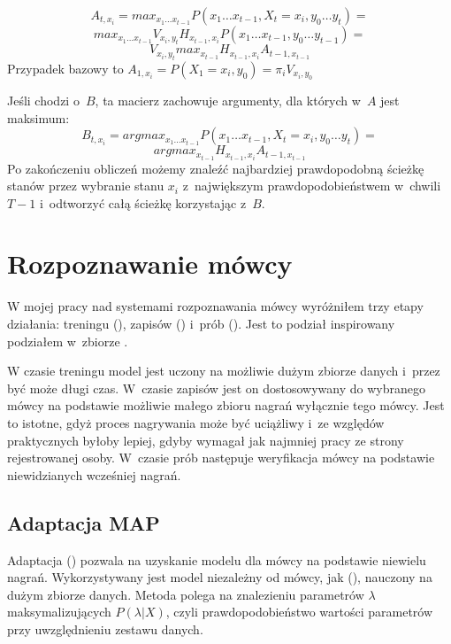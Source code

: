 $$A_{t,x_i} = max_{x_1 \dots x_{t-1}} P(x_1 \dots x_{t-1}, X_t = x_i, y_0 \dots y_t) =$$
$$max_{x_1 \dots x_{t-1}} V_{x_i, y_t} H_{x_{t-1}, x_i} P(x_1 \dots x_{t-1}, y_0 \dots y_{t-1}) =$$
$$V_{x_i, y_t} max_{x_{t-1}}H_{x_{t-1}, x_i} A_{t-1, x_{t-1}}$$
Przypadek bazowy to $A_{1,x_i} = P(X_1 = x_i, y_0) = \pi_i V_{x_i, y_0}$

Jeśli chodzi o~$B$, ta macierz zachowuje argumenty, dla których w~$A$ jest maksimum:
$$B_{t, x_i} = argmax_{x_1 \dots x_{t-1}} P(x_1 \dots x_{t-1}, X_t = x_i, y_0 \dots y_t) =$$
$$argmax_{x_{t-1}} H_{x_{t-1}, x_i} A_{t-1, x_{t-1}}$$
Po zakończeniu obliczeń możemy znaleźć najbardziej prawdopodobną ścieżkę stanów przez wybranie stanu $x_i$ z~największym prawdopodobieństwem w~chwili $T-1$ i~odtworzyć całą ścieżkę korzystając z~$B$\cite{aTutorialOnHidden}.

\section{Rozpoznawanie mówcy}\label{sec:rozpoznawanie_mowcy}

W mojej pracy nad systemami rozpoznawania mówcy wyróżniłem trzy etapy działania: treningu (),
zapisów () i~prób (). Jest to podział inspirowany podziałem w~zbiorze .

W czasie treningu model jest uczony na możliwie dużym zbiorze danych i~przez być może długi czas. W~czasie zapisów
jest on dostosowywany do wybranego mówcy na podstawie możliwie małego zbioru nagrań wyłącznie tego mówcy. Jest
to istotne, gdyż proces nagrywania może być uciążliwy i~ze względów praktycznych byłoby lepiej, gdyby wymagał
jak najmniej pracy ze strony rejestrowanej osoby. W~czasie prób następuje weryfikacja mówcy na podstawie niewidzianych
wcześniej nagrań.

\subsection{Adaptacja MAP}

Adaptacja  () pozwala na uzyskanie modelu dla mówcy na
podstawie niewielu nagrań. Wykorzystywany jest model niezależny
od mówcy, jak  (), nauczony na dużym zbiorze danych.
Metoda polega na znalezieniu parametrów $\lambda$
maksymalizujących $P(\lambda | X)$, czyli prawdopodobieństwo wartości parametrów przy uwzględnieniu zestawu danych.

